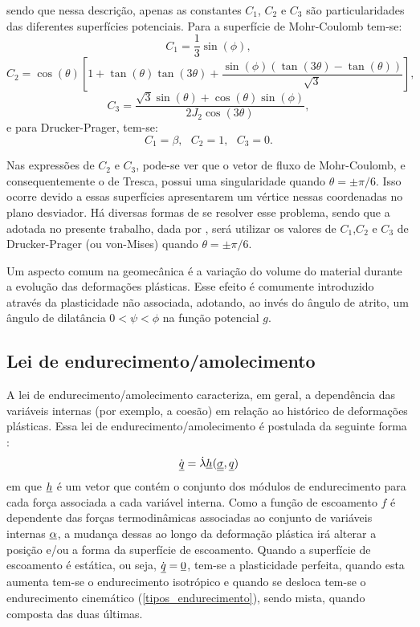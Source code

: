 sendo que nessa descrição, apenas as constantes $C_1$, $C_2$  e $C_3$ são particularidades das diferentes superfícies potenciais. Para a superfície de Mohr-Coulomb tem-se:
\begin{equation}
	\label{eq:c1MC}
	C_1 = \dfrac{1}{3}\sin(\phi),
\end{equation}
\begin{equation}
	\label{eq:c2MC}
	C_2 = \cos(\theta)\left[1+\tan(\theta)\tan(3\theta) + \dfrac{\sin(\phi)\left(\tan(3\theta)-\tan(\theta)\right)}{\sqrt{3}}\right],
\end{equation}
\begin{equation}
	\label{eq:c3MC}
	C_3 = \dfrac{\sqrt{3}\sin(\theta)+\cos(\theta)\sin(\phi)}{2J_2\cos(3\theta)},
\end{equation}
e para Drucker-Prager, tem-se:
\begin{equation}
	\label{eq:c1c2c3DP}
	C_1 = \beta,~~~C_2 = 1,~~~C_3 = 0.
\end{equation}

Nas expressões de $C_2$ e $C_3$, pode-se ver que o vetor de fluxo de Mohr-Coulomb, e consequentemente o de Tresca, possui uma singularidade quando $\theta = \pm \pi/6$. Isso ocorre devido a essas superfícies apresentarem um vértice nessas coordenadas no plano desviador. Há diversas formas de se resolver esse problema, sendo que a adotada no presente trabalho, dada por , será utilizar os valores de $C_1$,$C_2$ e $C_3$ de Drucker-Prager (ou von-Mises) quando $\theta = \pm \pi/6$.

Um aspecto comum na geomecânica é a variação do volume do material durante a evolução das deformações plásticas. Esse efeito é comumente introduzido através da plasticidade não associada, adotando, ao invés do ângulo de atrito, um ângulo de dilatância $0<\psi<\phi$  na função potencial $g$.

\subsection{Lei de endurecimento/amolecimento}
A lei de endurecimento/amolecimento caracteriza, em geral, a dependência das variáveis internas (por exemplo, a coesão) em relação ao histórico de deformações plásticas. Essa lei de endurecimento/amolecimento é postulada da seguinte forma \cite[p. 249]{Belytschko2000}:
\begin{equation}
	\label{eq:amolecimento}
	\dot {\underline q} = \dot \lambda \underline h(\underline{\underline \sigma},\underline q)
\end{equation}
em que $\underline h$ é um vetor que contém o conjunto dos módulos de endurecimento para cada força associada a cada variável interna. Como a função de escoamento $f$ é dependente das forças termodinâmicas associadas ao conjunto de variáveis internas $\underline \alpha$, a mudança dessas ao longo da deformação plástica irá alterar a posição e/ou a forma da superfície de escoamento. Quando a superfície de escoamento é estática, ou seja, $\dot {\underline q}=\underline 0$, tem-se a plasticidade perfeita, quando esta aumenta tem-se o endurecimento isotrópico e quando se desloca tem-se o endurecimento cinemático (\autoref{tipos_endurecimento}), sendo mista, quando composta das duas últimas.

